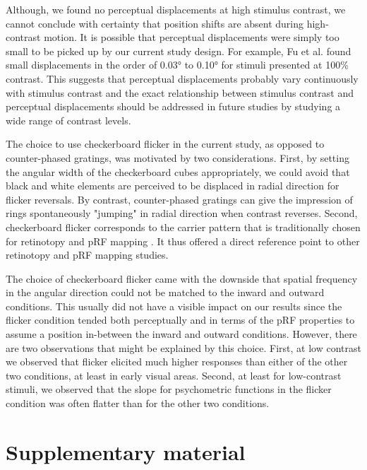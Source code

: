 Although, we found no perceptual displacements at high stimulus contrast, we cannot conclude with certainty that position shifts are absent during high-contrast motion. It is possible that perceptual displacements were simply too small to be picked up by our current study design. For example, Fu et al. \parencite*{Fu2004} found small displacements in the order of 0.03° to 0.10° for stimuli presented at 100\% contrast. This suggests that perceptual displacements probably vary continuously with stimulus contrast and the exact relationship between stimulus contrast and perceptual displacements should be addressed in future studies by studying a wide range of contrast levels.

The choice to use checkerboard flicker in the current study, as opposed to counter-phased gratings, was motivated by two considerations. First, by setting the angular width of the checkerboard cubes appropriately, we could avoid that black and white elements are perceived to be displaced in radial direction for flicker reversals. By contrast, counter-phased gratings can give the impression of rings spontaneously "jumping" in radial direction when contrast reverses. Second, checkerboard flicker corresponds to the carrier pattern that is traditionally chosen for retinotopy \parencite{Sereno1995} and pRF mapping \parencite{Dumoulin2008}. It thus offered a direct reference point to other retinotopy and pRF mapping studies.

The choice of checkerboard flicker came with the downside that spatial frequency in the angular direction could not be matched to the inward and outward conditions. This usually did not have a visible impact on our results since the flicker condition tended both perceptually and in terms of the pRF properties to assume a position in-between the inward and outward conditions. However, there are two observations that might be explained by this choice. First, at low contrast we observed that flicker elicited much higher responses than either of the other two conditions, at least in early visual areas. Second, at least for low-contrast stimuli, we observed that the slope for psychometric functions in the flicker condition was often flatter than for the other two conditions.

\clearpage
\section{Supplementary material}
\beginsupplement

